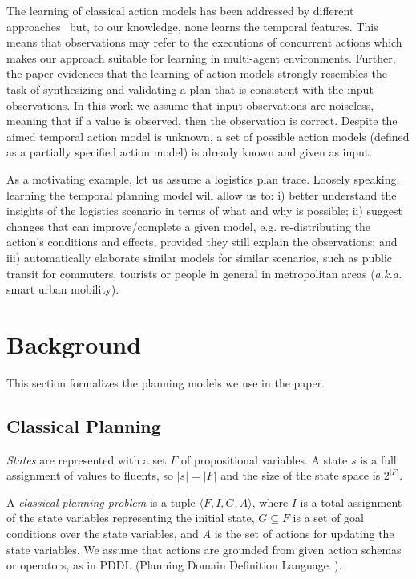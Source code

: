 \documentclass[runningheads]{llncs}
\newcommand{\tup}[1]{{\langle #1 \rangle}}
\begin{document}
The learning of classical action models has been addressed by different approaches~\cite{arora2018review} but, to our knowledge, none learns the temporal features. This means that observations may refer to the executions of concurrent actions which makes our approach suitable for learning in multi-agent environments. Further, the paper evidences that the learning of action models strongly resembles the task of synthesizing and validating a plan that is consistent with the input observations. In this work we assume that input observations are noiseless, meaning that if a value is observed, then the observation is correct. Despite the aimed temporal action model is unknown, a set of possible action models (defined as a partially specified action model) is already known and given as input. 

As a motivating example, let us assume a logistics plan trace. Loosely speaking, learning the temporal planning model will allow us to: i) better understand the insights of the logistics scenario in terms of what and why is possible; ii) suggest changes that can improve/complete a given model, e.g. re-distributing the action's conditions and effects, provided they still explain the observations; and iii) automatically elaborate similar models for similar scenarios, such as public transit for commuters, tourists or people in general in metropolitan areas (\emph{a.k.a.} smart urban mobility). 



\section{Background}
\label{sec:background}
This section formalizes the planning models we use in the paper.

\subsection{Classical Planning}
\label{sec:classicalplanning}
{\em States} are represented with a set $F$ of propositional variables. A state $s$ is a full assignment of values to fluents, so $|s|=|F|$ and the size of the state space is $2^{|F|}$.

A {\em classical planning problem} is a tuple $\tup{F,I,G,A}$, where $I$ is a total assignment of the state variables representing the initial state, $G \subseteq F$ is a set of goal conditions over the state variables, and $A$ is the set of actions for updating the state variables. We assume that actions are grounded from given action schemas or operators, as in PDDL (Planning Domain Definition Language~\cite{fox2003pddl2}).
\end{document}
